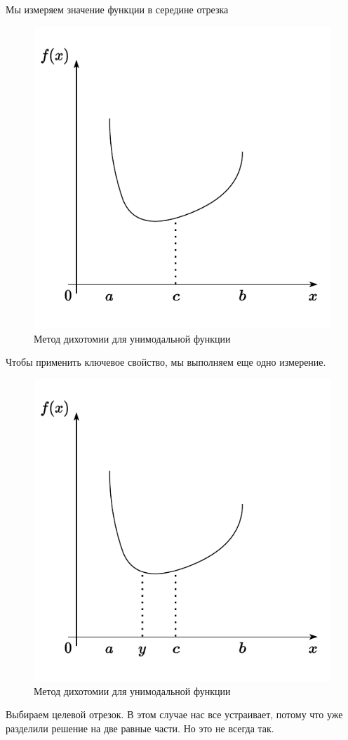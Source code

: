 \documentclass[
  russian,
  letterpaper,
  DIV=11,
  numbers=noendperiod]{scrartcl}
\begin{document}
Мы измеряем значение функции в середине отрезка

\begin{figure}[H]

{\centering \includegraphics[width=0.4\linewidth,height=\textheight,keepaspectratio]{Dichotomy2.pdf}

}

\caption{Метод дихотомии для унимодальной функции}

\end{figure}%

Чтобы применить ключевое свойство, мы выполняем еще одно измерение.

\begin{figure}[H]

{\centering \includegraphics[width=0.4\linewidth,height=\textheight,keepaspectratio]{Dichotomy3.pdf}

}

\caption{Метод дихотомии для унимодальной функции}

\end{figure}%

Выбираем целевой отрезок. В этом случае нас все устраивает, потому что
уже разделили решение на две равные части. Но это не всегда так.
\end{document}
